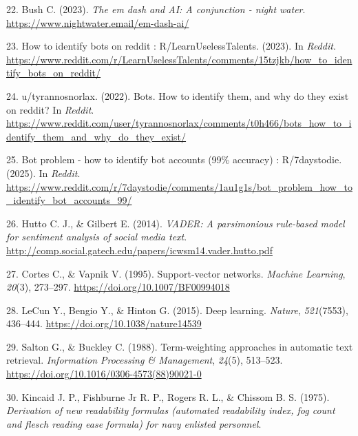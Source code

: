 \documentclass[
  12pt,
  letterpaper,
  DIV=11,
  numbers=noendperiod]{scrartcl}
\newlength{\cslhangindent}
\newenvironment{CSLReferences}[2] %
 {\begin{list}{}{%
  \setlength{\itemindent}{0pt}
  \setlength{\leftmargin}{0pt}
  \setlength{\parsep}{0pt}
  \ifodd #1
   \setlength{\leftmargin}{\cslhangindent}
   \setlength{\itemindent}{-1\cslhangindent}
  \fi
  \setlength{\itemsep}{#2\baselineskip}}}
 {\end{list}}
\begin{document}
\begin{CSLReferences}{1}{0}
22. Bush C. (2023). \emph{The em dash and AI: A conjunction - night
water}. \url{https://www.nightwater.email/em-dash-ai/}

23. How to identify bots on reddit : R/LearnUselessTalents. (2023). In
\emph{Reddit}.
\url{https://www.reddit.com/r/LearnUselessTalents/comments/15tzjkb/how_to_identify_bots_on_reddit/}

24. u/tyrannosnorlax. (2022). Bots. How to identify them, and why do
they exist on reddit? In \emph{Reddit}.
\url{https://www.reddit.com/user/tyrannosnorlax/comments/t0h466/bots_how_to_identify_them_and_why_do_they_exist/}

25. Bot problem - how to identify bot accounts (99\% accuracy) :
R/7daystodie. (2025). In \emph{Reddit}.
\url{https://www.reddit.com/r/7daystodie/comments/1au1g1s/bot_problem_how_to_identify_bot_accounts_99/}

26. Hutto C. J., \& Gilbert E. (2014). \emph{VADER: A parsimonious
rule-based model for sentiment analysis of social media text}.
\url{http://comp.social.gatech.edu/papers/icwsm14.vader.hutto.pdf}

27. Cortes C., \& Vapnik V. (1995). Support-vector networks.
\emph{Machine Learning}, \emph{20}(3), 273--297.
\url{https://doi.org/10.1007/BF00994018}

28. LeCun Y., Bengio Y., \& Hinton G. (2015). Deep learning.
\emph{Nature}, \emph{521}(7553), 436--444.
\url{https://doi.org/10.1038/nature14539}

29. Salton G., \& Buckley C. (1988). Term-weighting approaches in
automatic text retrieval. \emph{Information Processing \& Management},
\emph{24}(5), 513--523.
\url{https://doi.org/10.1016/0306-4573(88)90021-0}

30. Kincaid J. P., Fishburne Jr R. P., Rogers R. L., \& Chissom B. S.
(1975). \emph{Derivation of new readability formulas (automated
readability index, fog count and flesch reading ease formula) for navy
enlisted personnel}.

\end{CSLReferences}

\newpage
\end{document}
